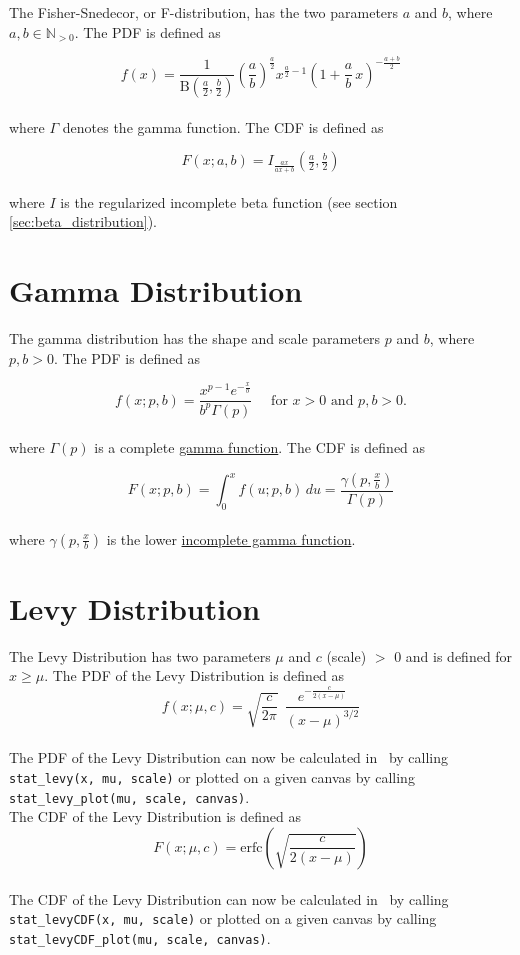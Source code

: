 		The Fisher-Snedecor, or F-distribution, has the two parameters $a$ and $b$, where $a,b \in \mathbb{N}_{>0}$. The \ac{PDF} is defined as

		$$
			f(x) = \frac{1}{\mathrm{B}\!\left(\frac{a}{2},\frac{b}{2}\right)} \left(\frac{a}{b}\right)^{\frac{a}{2}} x^{\frac{a}{2} - 1} \left(1+\frac{a}{b}\,x\right)^{-\frac{a+b}{2}}
		$$
		\\[0.3cm]
		where $\Gamma$ denotes the gamma function.
		The \ac{CDF} is defined as

		$$F(x; a,b)=I_{\frac{a x}{a x + b}}\left (\tfrac{a}{2}, \tfrac{b}{2} \right)$$
		\\[0.3cm]
		where $I$ is the regularized incomplete beta function (see section \ref{sec:beta_distribution}).

	\section{Gamma Distribution}

		The gamma distribution has the shape and scale parameters $p$ and $b$, where $p,b > 0$. The \ac{PDF} is defined as

		$$f(x;p,b) =  \frac{x^{p-1}e^{-\frac{x}{b}}}{b^p\Gamma(p)} \quad \text{ for } x > 0 \text{ and } p, b > 0.$$
		\\[0.3cm]
		where $\Gamma(p)$ is a complete \href{https://en.wikipedia.org/wiki/Gamma_function}{gamma function}.		The \ac{CDF} is defined as

		$$F(x;p,b) = \int_0^x f(u;p,b)\,du = \frac{\gamma\left(p, \frac{x}{b}\right)}{\Gamma(p)}$$
		\\[0.3cm]
		where $\gamma\left(p, \frac{x}{b}\right)$ is the lower \href{https://en.wikipedia.org/wiki/Incomplete_gamma_function}{incomplete gamma function}.

	\section{Levy Distribution}
	
		The Levy Distribution has two parameters $\mu$ and $c$ (scale) $>$ 0 and is defined for $x \geq \mu$. The \ac{PDF} of the Levy Distribution is defined as
		\\[0.3cm]
		$$f(x;\mu,c)=\sqrt{\frac{c}{2\pi}}~~\frac{e^{ -\frac{c}{2(x-\mu)}}} {(x-\mu)^{3/2}}$$
		\\[0.3cm]
		The \ac{PDF} of the Levy Distribution can now be calculated in \setlx\ by calling \lstinline{stat_levy(x, mu, scale)} or plotted on a given canvas by calling \lstinline{stat_levy_plot(mu, scale, canvas)}.
		\\[0.3cm]
		The \ac{CDF} of the Levy Distribution is defined as
		\\[0.3cm]
		$$F(x;\mu,c)=\textrm{erfc}\left(\sqrt{\frac{c}{2(x-\mu)}}\right)$$
		\\[0.3cm]
		The \ac{CDF} of the Levy Distribution can now be calculated in \setlx\ by calling \lstinline{stat_levyCDF(x, mu, scale)} or plotted on a given canvas by calling \lstinline{stat_levyCDF_plot(mu, scale, canvas)}.

